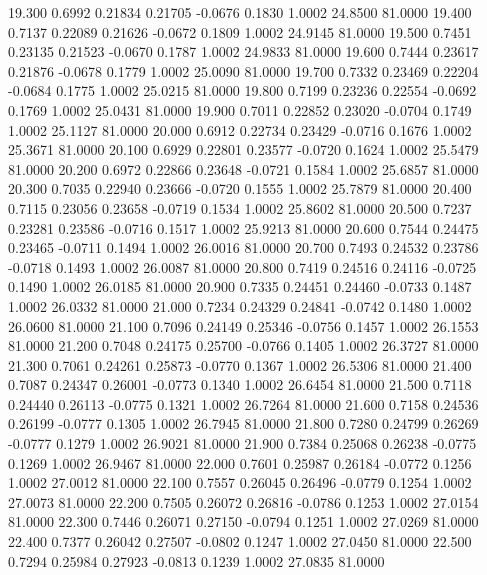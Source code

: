   19.300   0.6992   0.21834   0.21705  -0.0676   0.1830   1.0002  24.8500  81.0000
  19.400   0.7137   0.22089   0.21626  -0.0672   0.1809   1.0002  24.9145  81.0000
  19.500   0.7451   0.23135   0.21523  -0.0670   0.1787   1.0002  24.9833  81.0000
  19.600   0.7444   0.23617   0.21876  -0.0678   0.1779   1.0002  25.0090  81.0000
  19.700   0.7332   0.23469   0.22204  -0.0684   0.1775   1.0002  25.0215  81.0000
  19.800   0.7199   0.23236   0.22554  -0.0692   0.1769   1.0002  25.0431  81.0000
  19.900   0.7011   0.22852   0.23020  -0.0704   0.1749   1.0002  25.1127  81.0000
  20.000   0.6912   0.22734   0.23429  -0.0716   0.1676   1.0002  25.3671  81.0000
  20.100   0.6929   0.22801   0.23577  -0.0720   0.1624   1.0002  25.5479  81.0000
  20.200   0.6972   0.22866   0.23648  -0.0721   0.1584   1.0002  25.6857  81.0000
  20.300   0.7035   0.22940   0.23666  -0.0720   0.1555   1.0002  25.7879  81.0000
  20.400   0.7115   0.23056   0.23658  -0.0719   0.1534   1.0002  25.8602  81.0000
  20.500   0.7237   0.23281   0.23586  -0.0716   0.1517   1.0002  25.9213  81.0000
  20.600   0.7544   0.24475   0.23465  -0.0711   0.1494   1.0002  26.0016  81.0000
  20.700   0.7493   0.24532   0.23786  -0.0718   0.1493   1.0002  26.0087  81.0000
  20.800   0.7419   0.24516   0.24116  -0.0725   0.1490   1.0002  26.0185  81.0000
  20.900   0.7335   0.24451   0.24460  -0.0733   0.1487   1.0002  26.0332  81.0000
  21.000   0.7234   0.24329   0.24841  -0.0742   0.1480   1.0002  26.0600  81.0000
  21.100   0.7096   0.24149   0.25346  -0.0756   0.1457   1.0002  26.1553  81.0000
  21.200   0.7048   0.24175   0.25700  -0.0766   0.1405   1.0002  26.3727  81.0000
  21.300   0.7061   0.24261   0.25873  -0.0770   0.1367   1.0002  26.5306  81.0000
  21.400   0.7087   0.24347   0.26001  -0.0773   0.1340   1.0002  26.6454  81.0000
  21.500   0.7118   0.24440   0.26113  -0.0775   0.1321   1.0002  26.7264  81.0000
  21.600   0.7158   0.24536   0.26199  -0.0777   0.1305   1.0002  26.7945  81.0000
  21.800   0.7280   0.24799   0.26269  -0.0777   0.1279   1.0002  26.9021  81.0000
  21.900   0.7384   0.25068   0.26238  -0.0775   0.1269   1.0002  26.9467  81.0000
  22.000   0.7601   0.25987   0.26184  -0.0772   0.1256   1.0002  27.0012  81.0000
  22.100   0.7557   0.26045   0.26496  -0.0779   0.1254   1.0002  27.0073  81.0000
  22.200   0.7505   0.26072   0.26816  -0.0786   0.1253   1.0002  27.0154  81.0000
  22.300   0.7446   0.26071   0.27150  -0.0794   0.1251   1.0002  27.0269  81.0000
  22.400   0.7377   0.26042   0.27507  -0.0802   0.1247   1.0002  27.0450  81.0000
  22.500   0.7294   0.25984   0.27923  -0.0813   0.1239   1.0002  27.0835  81.0000
